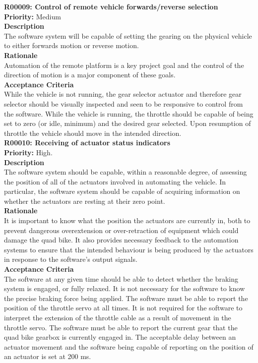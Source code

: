 \documentclass[main.tex]{subfiles}
\begin{document}
\begin{appendices}
\textbf{R00009: Control of remote vehicle forwards/reverse selection}\\
\textbf{Priority:} Medium\\
\textbf{Description}\\
The software system will be capable of setting the gearing on the physical vehicle to either forwards motion or reverse motion.\\
\textbf{Rationale}\\
Automation of the remote platform is a key project goal and the control of the direction of motion is a major component of these goals.\\
\textbf{Acceptance Criteria}\\
While the vehicle is not running, the gear selector actuator and therefore gear selector should be visually inspected and seen to be responsive to control from the software. While the vehicle is running, the throttle should be capable of being set to zero (or idle, minimum) and the desired gear selected. Upon resumption of throttle the vehicle should move in the intended direction.\\

\textbf{R00010: Receiving of actuator status indicators}\\
\textbf{Priority:} High.\\
\textbf{Description}\\
The software system should be capable, within a reasonable degree, of assessing the position of all of the actuators involved in automating the vehicle. In particular, the software system should be capable of acquiring information on whether the actuators are resting at their zero point.\\
\textbf{Rationale}\\
It is important to know what the position the actuators are currently in, both to prevent dangerous overextension or over-retraction of equipment which could damage the quad bike. It also provides necessary feedback to the automation systems to ensure that the intended behaviour is being produced by the actuators in response to the software's output signals.\\
\textbf{Acceptance Criteria}\\
The software at any given time should be able to detect whether the braking system is engaged, or fully relaxed. It is not necessary for the software to know the precise braking force being applied. The software must be able to report the position of the throttle servo at all times. It is not required for the software to interpret the extension of the throttle cable as a result of movement in the throttle servo. The software must be able to report the current gear that the quad bike gearbox is currently engaged in. The acceptable delay between an actuator movement and the software being capable of reporting on the position of an actuator is set at 200 ms.\\


\end{appendices}
\end{document}
